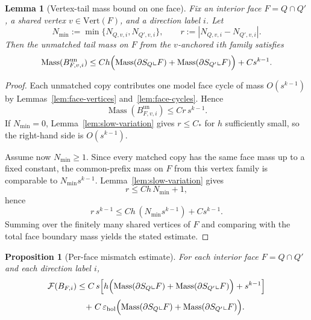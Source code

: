\documentclass[11pt]{article}
\numberwithin{equation}{section}
\theoremstyle{plain}
\newtheorem{proposition}[theorem]{Proposition}
\newtheorem{lemma}[theorem]{Lemma}
\theoremstyle{definition}
\theoremstyle{remark}
\DeclareMathOperator{\Mass}{Mass}
\newcommand{\eps}{\varepsilon}
\begin{document}
\begin{lemma}[Vertex-tail mass bound on one face]\label{lem:tail-mass}
Fix an interior face $F=Q\cap Q'$, a shared vertex $v\in\mathrm{Vert}(F)$, and a direction label $i$.  Let
\[
N_{\min}:=\min\{N_{Q,v,i},N_{Q',v,i}\},
\qquad
r:=|N_{Q,v,i}-N_{Q',v,i}|.
\]
Then the unmatched tail mass on $F$ from the $v$-anchored $i$th family satisfies
\[
\Mass(B^{\mathrm{un}}_{F,v,i})
\le
C h\Bigl(\Mass(\partial S_Q\llcorner F)+\Mass(\partial S_{Q'}\llcorner F)\Bigr)+C s^{k-1}.
\]
\end{lemma}

\begin{proof}
Each unmatched copy contributes one model face cycle of mass $O(s^{k-1})$ by Lemmas~\ref{lem:face-vertices} and~\ref{lem:face-cycles}.  Hence
\[
\Mass(B^{\mathrm{un}}_{F,v,i})\le C r\,s^{k-1}.
\]
If $N_{\min}=0$, Lemma~\ref{lem:slow-variation} gives $r\le C_*$ for $h$ sufficiently small, so the right-hand side is $O(s^{k-1})$.

Assume now $N_{\min}\ge 1$.  Since every matched copy has the same face mass up to a fixed constant, the common-prefix mass on $F$ from this vertex family is comparable to $N_{\min}s^{k-1}$.  Lemma~\ref{lem:slow-variation} gives
\[
r\le Ch\,N_{\min}+1,
\]
hence
\[
r\,s^{k-1}\le C h\,(N_{\min}s^{k-1})+C s^{k-1}.
\]
Summing over the finitely many shared vertices of $F$ and comparing with the total face boundary mass yields the stated estimate.
\end{proof}

\begin{proposition}[Per-face mismatch estimate]\label{prop:face-mismatch}
For each interior face $F=Q\cap Q'$ and each direction label $i$,
\[
\mathcal F(B_{F,i})
\le
C\,s\!\left[
h\Bigl(\Mass(\partial S_Q\llcorner F)+\Mass(\partial S_{Q'}\llcorner F)\Bigr)+s^{k-1}
\right]
\]
\[
\qquad
+\;C\,\eps_{\mathrm{hol}}\Bigl(\Mass(\partial S_Q\llcorner F)+\Mass(\partial S_{Q'}\llcorner F)\Bigr).
\]
\end{proposition}
\end{document}
